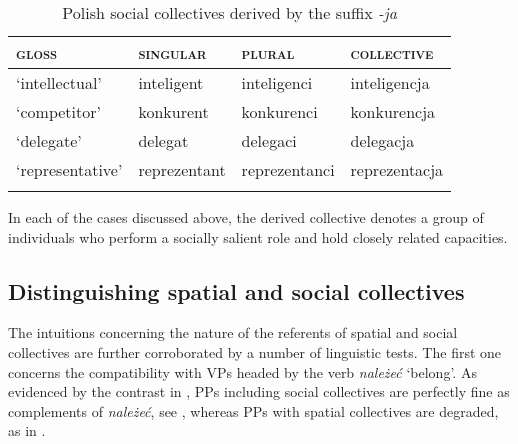 \documentclass[output=paper]{langscibook}
\begin{document}
\begin{table}[h!]
\caption{Polish social collectives derived by the suffix \textit{-ja}} 
\label{wan:tab:inteligencja}
 \begin{tabular}{llll} 
  \lsptoprule
         \textsc{gloss}   & \textsc{singular} & \textsc{plural} & \textsc{collective} \\ 
  \midrule
  `intellectual'  &   inteligent &    inteligenci  &    inteligencja \\
  `competitor'  &   konkurent &   konkurenci &    konkurencja \\
  `delegate'  &   delegat &   delegaci &    delegacja \\
  `representative'  &   reprezentant &   reprezentanci &    reprezentacja \\
  \lspbottomrule
 \end{tabular}
\end{table}

In each of the cases discussed above, the derived collective denotes a group of individuals who perform a socially salient role and hold closely related capacities.  

\subsection{Distinguishing spatial and social collectives}\label{wan:sec:distinguishing-social-and-spatial-collectives}

The intuitions concerning the nature of the referents of spatial and social collectives are further corroborated by a number of linguistic tests. The first one concerns the compatibility with VPs headed by the verb \textit{należeć} `belong'. As evidenced by the contrast in , PPs including social collectives are perfectly fine as complements of \textit{należeć}, see , whereas PPs with spatial collectives are degraded, as in .


\ea\judgewidth{\#}\label{wan:ex:belong}
\label{wan:ex:belong-social}
\label{wan:ex:belong-spatial}
\z
\z
\end{document}
